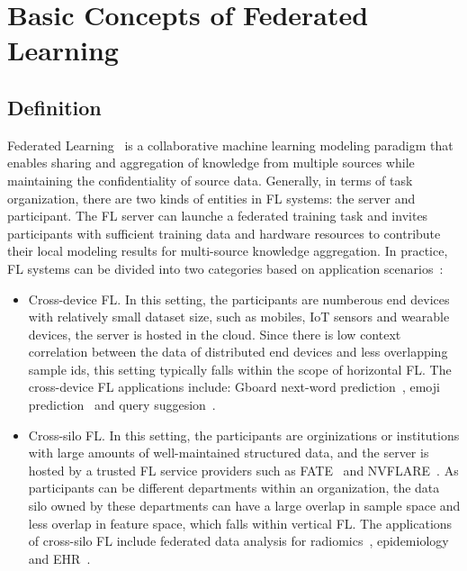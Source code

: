 \section{Basic Concepts of Federated Learning}

\subsection{Definition}
Federated Learning~\cite{IEEEstd3652, mcmahan2017communication} is a collaborative machine learning modeling paradigm that enables sharing and aggregation of knowledge from multiple sources while maintaining the confidentiality of source data.
Generally, in terms of task organization, there are two kinds of entities in FL systems: the server and participant. 
The FL server can launche a federated training task and invites participants with sufficient training data and hardware resources to contribute their local modeling results for multi-source knowledge aggregation.
In practice, FL systems can be divided into two categories based on application scenarios~\cite{kairouz2021advances}:
\begin{itemize}
    \item Cross-device FL. In this setting, the participants are numberous end devices with relatively small dataset size, such as mobiles, IoT sensors and wearable devices, the server is hosted in the cloud. Since there is low context correlation between the data of distributed end devices and less overlapping sample ids, this setting typically falls within the scope of horizontal FL. The cross-device FL applications include: Gboard next-word prediction~\cite{hard2018federated}, emoji prediction~\cite{ramaswamy2019federated} and query suggesion~\cite{yang2018applied}.
    \item Cross-silo FL. In this setting, the participants are orginizations or institutions with large amounts of well-maintained structured data, and the server is hosted by a trusted FL service providers such as FATE~\cite{liu2021fate} and NVFLARE~\cite{roth2022nvidia}. As participants can be different departments within an organization, the data silo owned by these departments can have a large overlap in sample space and less overlap in feature space, which falls within vertical FL. The applications of cross-silo FL include federated data analysis for radiomics~\cite{li2019privacy, li2020multi, scherer2020joint}, epidemiology~\cite{dayan2021federated} and EHR~\cite{brisimi2018federated, huang2019patient}.
\end{itemize}

